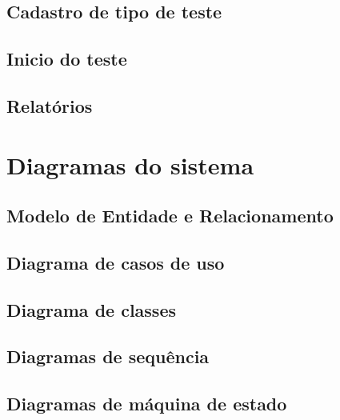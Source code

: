 \subsection{Cadastro de tipo de teste}

\subsection{Inicio do teste}

\subsection{Relatórios}

\section{Diagramas do sistema}

\subsection{Modelo de Entidade e Relacionamento \cite{26}}

\subsection{Diagrama de casos de uso \cite{27}}

\subsection{Diagrama de classes \cite{27}}

\subsection{Diagramas de sequência \cite{28}}

\subsection{Diagramas de máquina de estado \cite{30}}
